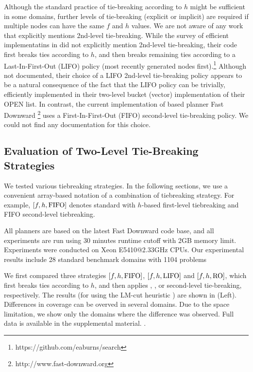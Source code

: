 Although the standard practice of tie-breaking according to $h$ might be sufficient in some domains, further levels of tie-breaking (explicit or implicit) are required if multiple nodes can have the same $f$ and $h$ values.
We are not aware of any work that explicitly mentions 2nd-level tie-breaking.
While the survey of efficient \astar implementatins in \citeauthor{burns2012implementing} did not explicitly mention 2nd-level tie-breaking, their code first breaks ties according to $h$, and then breaks remaining ties according to a Last-In-First-Out (LIFO) policy (most recently generated nodes first).\footnote{https://github.com/eaburns/search}
Although not documented, their choice of a LIFO 2nd-level tie-breaking policy appears to be a natural consequence of the fact that the LIFO policy can be trivially, efficiently implemented in their two-level bucket (vector) implementation of their OPEN list.
In contrast, the current implementation of \sota \astar based planner Fast
Downward \cite{Helmert2006}\footnote{http://www.fast-downward.org} uses a First-In-First-Out (FIFO) second-level tie-breaking policy. We could not find any documentation for this choice. 


\subsection{Evaluation of Two-Level Tie-Breaking Strategies}


We tested various tiebreaking strategies. In the following sections, we
use a convenient array-based notation of a combination of tiebreaking
strategy.  For example, $[f,h,\mbox{FIFO}]$ denotes standard \astar with
$h$-based first-level tiebreaking and FIFO
second-level tiebreaking.

All planners are based on the latest Fast Downward code base, and all
experiments are run using 30 minutes runtime cutoff with 2GB memory
limit. Experiments were conducted on Xeon E5410@2.33GHz CPUs.
Our experimental results include 28 standard benchmark domains with 1104
problems

We first compared three strategies 
$[f,h,\mbox{FIFO}]$, $[f,h,\mbox{LIFO}]$ and $[f,h,\mbox{RO}]$, 
which first breaks ties according to $h$, and then applies \fifo, \lifo, or \ro second-level tie-breaking, respectively.
The results (for \astar using the LM-cut heuristic \cite{Helmert2009}) are shown 
 in  (Left).  Differences in coverage can be overved in several domains.
Due to the space limitation, we show only the domains
where the difference was observed. Full data is available in the
supplemental material. .

